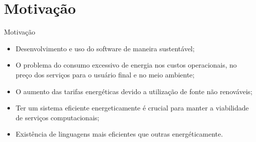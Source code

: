 \section{Motivação}

\begin{frame}{Motivação}
    \begin{itemize}
        \item Desenvolvimento e uso do software de maneira sustentável;
        \item O problema do consumo excessivo de energia nos custos operacionais, no preço dos serviços para o usuário final e no meio ambiente;
        \item O aumento das tarifas energéticas devido a utilização de fonte não renováveis;
        \item Ter um sistema eficiente energeticamente é crucial para manter a viabilidade de serviços computacionais;
        \item Existência de linguagens mais eficientes que outras energéticamente.
    \end{itemize}
\end{frame}
